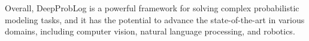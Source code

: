 
Overall, DeepProbLog is a powerful framework for solving complex probabilistic modeling tasks, and it has the potential to advance the state-of-the-art in various domains, including computer vision, natural language processing, and robotics.